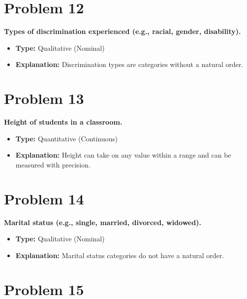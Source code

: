 \documentclass[
  letterpaper,
  DIV=11,
  numbers=noendperiod]{scrreprt}
\begin{document}
\section*{Problem 12}\label{problem-12-2}


\textbf{Types of discrimination experienced (e.g., racial, gender,
disability).}

\begin{itemize}
\item
  \textbf{Type:} Qualitative (Nominal)
\item
  \textbf{Explanation:} Discrimination types are categories without a
  natural order.
\end{itemize}

\section*{Problem 13}\label{problem-13-2}


\textbf{Height of students in a classroom.}

\begin{itemize}
\item
  \textbf{Type:} Quantitative (Continuous)
\item
  \textbf{Explanation:} Height can take on any value within a range and
  can be measured with precision.
\end{itemize}

\section*{Problem 14}\label{problem-14-2}


\textbf{Marital status (e.g., single, married, divorced, widowed).}

\begin{itemize}
\item
  \textbf{Type:} Qualitative (Nominal)
\item
  \textbf{Explanation:} Marital status categories do not have a natural
  order.
\end{itemize}

\section*{Problem 15}\label{problem-15-2}
\end{document}
